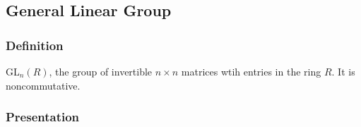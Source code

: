 \subsection{General Linear Group}\label{generallineargroup}

\subsubsection{Definition}
GL$_n(R)$, the group of invertible $n \times n$ matrices wtih entries in the ring $R$. It is noncommutative.

\subsubsection{Presentation}